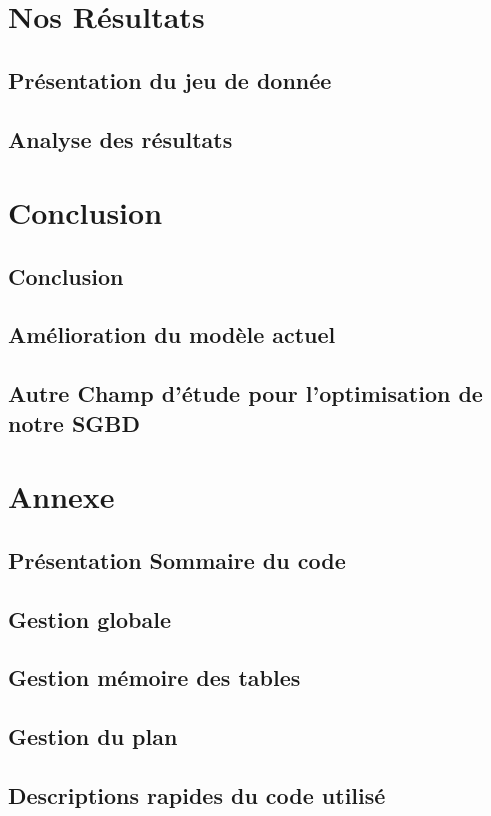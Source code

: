 \documentclass[12pt,a4paper]{article}
\begin{document}
\section{Nos Résultats}
\subsection{Présentation du jeu de donnée}
\subsection{Analyse des résultats}
\label{Analyse:OrdreJointure}
\section{Conclusion}
\subsection{Conclusion}
\subsection{Amélioration du modèle actuel}
\subsection{Autre Champ d'étude pour l'optimisation de notre SGBD}
\section{Annexe}
\subsection{Présentation Sommaire du code}
\subsection{Gestion globale}
\subsection{Gestion mémoire des tables}
\label{Code:data}
\subsection{Gestion du plan}
\subsection{Descriptions rapides du code utilisé}


\printbibliography
\end{document}
